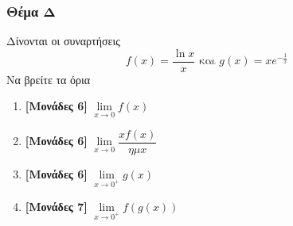 \documentclass[12pt]{article}
\begin{document}
  \section*{Θέμα Δ}
    \noindent
    Δίνονται οι συναρτήσεις
    $$f(x)=\dfrac{\ln x}{x} \text{ και } g(x)=xe^{-\frac{1}{x}}$$
    Να βρείτε τα όρια
    \begin{enumerate}
        \item \textbf{[Μονάδες 6]} $\lim\limits_{x \to 0}{ f(x)}$
        \item \textbf{[Μονάδες 6]} $\lim\limits_{x \to 0}{ \dfrac{xf(x)}{ημx}}$
        \item \textbf{[Μονάδες 6]} $\lim\limits_{x \to 0^+}{ g(x)}$
        \item \textbf{[Μονάδες 7]} $\lim\limits_{x \to 0^+}{ f\left(g(x)\right)}$
    \end{enumerate}

\vspace{2\baselineskip}

\part*{}
\end{document}
